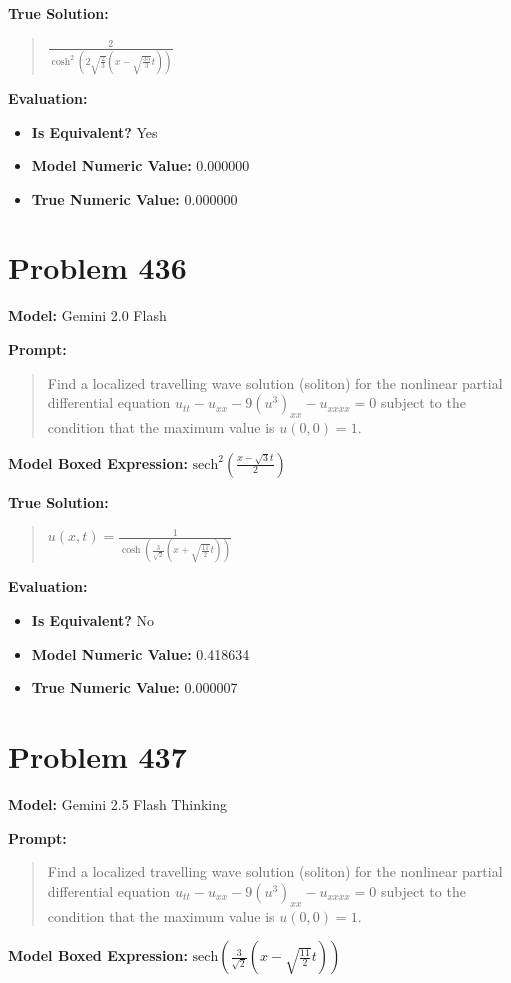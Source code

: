 \documentclass{article}
\begin{document}
\textbf{True Solution:}
\begin{quote}
$\frac{2}{\cosh^2(2\sqrt{\frac{2}{3}}(x-\sqrt{\frac{35}{3}}t))}$
\end{quote}

\textbf{Evaluation:}
\begin{itemize}
\item \textbf{Is Equivalent?} Yes
\item \textbf{Model Numeric Value:} 0.000000
\item \textbf{True Numeric Value:} 0.000000
\end{itemize}
\vspace{1cm}
\section*{Problem 436}
\textbf{Model:} Gemini 2.0 Flash

\textbf{Prompt:}
\begin{quote}
Find a localized travelling wave solution (soliton) for the nonlinear partial differential equation $u_{tt} - u_{xx} - 9(u^3)_{xx} - u_{xxxx}=0$ subject to the condition that the maximum value is $u(0,0) = 1$.
\end{quote}
\textbf{Model Boxed Expression:} $\text{sech}^2\left(\frac{x-\sqrt{3}t}{2}\right)$

\textbf{True Solution:}
\begin{quote}
$u(x,t)=\frac{1}{\cosh(\frac{3}{\sqrt{2}}(x+\sqrt{\frac{11}{2}}t))}$
\end{quote}

\textbf{Evaluation:}
\begin{itemize}
\item \textbf{Is Equivalent?} No
\item \textbf{Model Numeric Value:} 0.418634
\item \textbf{True Numeric Value:} 0.000007
\end{itemize}
\vspace{1cm}
\section*{Problem 437}
\textbf{Model:} Gemini 2.5 Flash Thinking

\textbf{Prompt:}
\begin{quote}
Find a localized travelling wave solution (soliton) for the nonlinear partial differential equation $u_{tt} - u_{xx} - 9(u^3)_{xx} - u_{xxxx}=0$ subject to the condition that the maximum value is $u(0,0) = 1$.
\end{quote}
\textbf{Model Boxed Expression:} $\text{sech}\left(\frac{3}{\sqrt{2}}\left(x - \sqrt{\frac{11}{2}}t\right)\right)$
\end{document}
